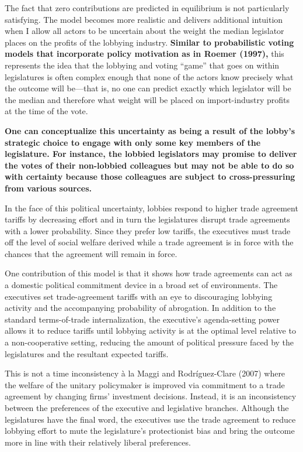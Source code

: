 \documentclass[10pt]{article}
\begin{document}
The fact that zero contributions are predicted in equilibrium is not particularly satisfying. The model becomes more realistic and delivers additional intuition when I allow all actors to be uncertain about the weight the median legislator places on the profits of the lobbying industry. \textbf{Similar to probabilistic voting models that incorporate policy motivation as in Roemer (1997),} this represents the idea that the lobbying and voting ``game'' that goes on within legislatures is often complex enough that none of the actors know precisely what the outcome will be---that is, no one can predict exactly which legislator will be the median and therefore what weight will be placed on import-industry profits at the time of the vote.

\textbf{One can conceptualize this uncertainty as being a result of the lobby's strategic choice to engage with only some key members of the legislature. For instance, the lobbied legislators may promise to deliver the votes of their non-lobbied colleagues but may not be able to do so with certainty because those colleagues are subject to cross-pressuring from various sources.}

In the face of this political uncertainty, lobbies respond to higher trade agreement tariffs by decreasing effort and in turn the legislatures disrupt trade agreements with a lower probability. Since they prefer low tariffs, the executives must trade off the level of social welfare derived while a trade agreement is in force with the chances that the agreement will remain in force.

One contribution of this model is that it shows how trade agreements can act as a domestic political commitment device in a broad set of environments. The executives set trade-agreement tariffs with an eye to discouraging lobbying activity and the accompanying probability of abrogation. In addition to the standard terms-of-trade internalization, the executive's agenda-setting power allows it to reduce tariffs until lobbying activity is at the optimal level relative to a non-cooperative setting, reducing the amount of political pressure faced by the legislatures and the resultant expected tariffs.

This is not a time inconsistency \`{a} la Maggi and Rodr\'{i}guez-Clare (2007) where the welfare of the unitary policymaker is improved via commitment to a trade agreement by changing firms' investment decisions. Instead, it is an inconsistency between the preferences of the executive and legislative branches. Although the legislatures have the final word, the executives use the trade agreement to reduce lobbying effort to mute the legislature's protectionist bias and bring the outcome more in line with their relatively liberal preferences.
\end{document}
